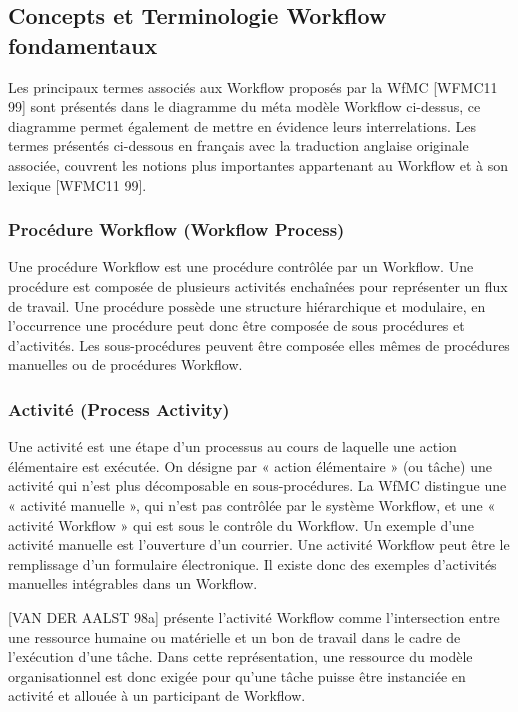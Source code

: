  	 
 	 
 	 
 
 	 
 	 
 	\subsection{Concepts et Terminologie Workflow fondamentaux } 
 	 
 	 Les principaux termes associés aux Workflow proposés par la WfMC [WFMC11 99] sont présentés dans le diagramme du méta modèle Workflow ci-dessus, ce diagramme permet également de mettre en évidence leurs interrelations. Les termes présentés ci-dessous en français avec la traduction anglaise originale associée, couvrent les notions plus importantes appartenant au Workflow et à son lexique [WFMC11 99]. 
 	 
 	 \subsubsection{Procédure Workflow (Workflow Process) }
 	 
 	 Une procédure Workflow est une procédure contrôlée par un Workflow. Une procédure est composée de plusieurs activités enchaînées pour représenter un flux de travail. Une procédure possède une structure hiérarchique et modulaire, en l’occurrence une procédure peut donc être composée de sous procédures et d’activités. Les sous-procédures peuvent être composée elles mêmes de procédures manuelles ou de procédures Workflow.
 	 
 	 
 	 \subsubsection{Activité (Process Activity) }
 	 Une activité est une étape d’un processus au cours de laquelle une action élémentaire est exécutée. On désigne par « action élémentaire » (ou tâche) une activité qui n’est plus décomposable en sous-procédures. La WfMC distingue une « activité manuelle », qui n’est pas contrôlée par le système Workflow, et une « activité Workflow » qui est sous le contrôle du Workflow. Un exemple d’une activité manuelle est l’ouverture d’un courrier. Une activité Workflow peut être le remplissage d’un formulaire électronique. Il existe donc des exemples d’activités manuelles intégrables dans un Workflow. 
 	 
 	 [VAN DER AALST 98a] présente l’activité Workflow comme l’intersection entre une ressource humaine ou matérielle et un bon de travail dans le cadre de l’exécution d’une tâche. Dans cette représentation, une ressource du modèle organisationnel est donc exigée pour qu’une tâche puisse être instanciée en activité et allouée à un participant de Workflow. 
 	 
